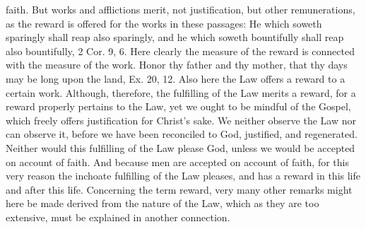 faith.  But works and afflictions merit, not justification, but other
remunerations, as the reward is offered for the works in these
passages: He which soweth sparingly shall reap also sparingly, and he
which soweth bountifully shall reap also bountifully, 2 Cor. 9, 6.
Here clearly the measure of the reward is connected with the measure
of the work.  Honor thy father and thy mother, that thy days may be
long upon the land, Ex. 20, 12. Also here the Law offers a reward to
a certain work.  Although, therefore, the fulfilling of the Law
merits a reward, for a reward properly pertains to the Law, yet we
ought to be mindful of the Gospel, which freely offers justification
for Christ's sake.  We neither observe the Law nor can observe it,
before we have been reconciled to God, justified, and regenerated.
Neither would this fulfilling of the Law please God, unless we would
be accepted on account of faith.  And because men are accepted on
account of faith, for this very reason the inchoate fulfilling of the
Law pleases, and has a reward in this life and after this life.
Concerning the term reward, very many other remarks might here be
made derived from the nature of the Law, which as they are too
extensive, must be explained in another connection.

